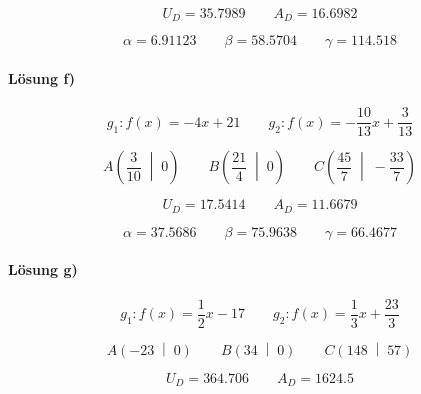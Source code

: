 \begin{equation*}
  U_D=\num{35.7989}
  \qquad
  A_D=\num{16.6982}
\end{equation*}

\begin{equation*}
  \alpha=\num{6.91123}
  \qquad
  \beta=\num{58.5704}
  \qquad
  \gamma=\num{114.518}
\end{equation*}

\paragraph{Lösung f)}
\begin{equation*}
  g_1:f(x)=-\num{4}x+\num{21}
  \qquad
  g_2:f(x)=-\frac{\num{10}}{\num{13}}x+\frac{\num{3}}{\num{13}}
\end{equation*}

\begin{equation*}
  A\left(\frac{\num{3}}{\num{10}}\;\middle|\;\num{0}\right)
  \qquad
  B\left(\frac{\num{21}}{\num{4}}\;\middle|\;\num{0}\right)
  \qquad
  C\left(\frac{\num{45}}{\num{7}}\;\middle|\;-\frac{\num{33}}{\num{7}}\right)
\end{equation*}

\begin{equation*}
  U_D=\num{17.5414}
  \qquad
  A_D=\num{11.6679}
\end{equation*}

\begin{equation*}
  \alpha=\num{37.5686}
  \qquad
  \beta=\num{75.9638}
  \qquad
  \gamma=\num{66.4677}
\end{equation*}

\paragraph{Lösung g)}
\begin{equation*}
  g_1:f(x)=\frac{\num{1}}{\num{2}}x-\num{17}
  \qquad
  g_2:f(x)=\frac{\num{1}}{\num{3}}x+\frac{\num{23}}{\num{3}}
\end{equation*}

\begin{equation*}
  A\left(\num{-23}\;\middle|\;\num{0}\right)
  \qquad
  B\left(\num{34}\;\middle|\;\num{0}\right)
  \qquad
  C\left(\num{148}\;\middle|\;\num{57}\right)
\end{equation*}

\begin{equation*}
  U_D=\num{364.706}
  \qquad
  A_D=\num{1624.5}
\end{equation*}

